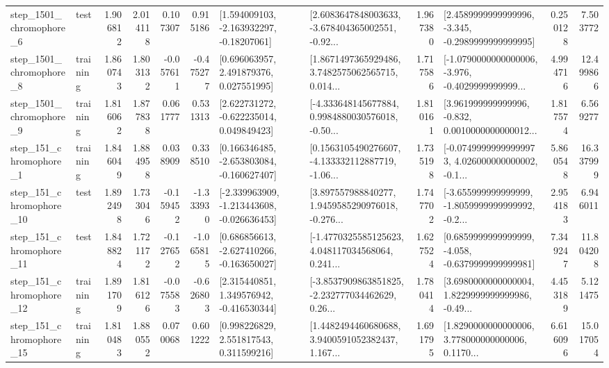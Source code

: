 \begin{tabular}{llrrrrllrlrr}
  step\_1501\_chromophore\_6 &      test &      1.906812 &    2.014118 &      0.107307 &  0.915186 &    [1.594009103, -2.163932297, -0.18207061] &  [2.6083647848003633, -3.678404365002551, -0.92... &       1.967380 &  [2.4589999999999996, -3.345, -0.2989999999999995] &            0.250128 &          7.503772 \\
  step\_1501\_chromophore\_8 &  training &      1.860743 &    1.803132 &     -0.057611 & -0.475277 &     [0.696063957, 2.491879376, 0.027551995] &  [1.8671497365929486, 3.7482575062565715, 0.014... &       1.717586 &  [-1.0790000000000006, -3.976, -0.4029999999999... &            4.994716 &         12.499866 \\
  step\_1501\_chromophore\_9 &  training &      1.816062 &    1.877838 &      0.061777 &  0.531313 &    [2.622731272, -0.622235014, 0.049849423] &  [-4.333648145677884, 0.9984880030576018, -0.50... &       1.810161 &  [3.961999999999996, -0.832, 0.0010000000000012... &            1.817574 &          6.569277 \\
   step\_151\_chromophore\_1 &  training &      1.846049 &    1.884958 &      0.038909 &  0.338510 &   [0.166346485, -2.653803084, -0.160627407] &  [0.1563105490276607, -4.133332112887719, -1.06... &       1.735198 &  [-0.07499999999999973, 4.026000000000002, -0.1... &            5.860548 &         16.337999 \\
  step\_151\_chromophore\_10 &      test &      1.892498 &    1.733046 &     -0.159452 & -1.333930 &  [-2.339963909, -1.213443608, -0.026636453] &  [3.897557988840277, 1.9459585290976018, -0.276... &       1.747702 &  [-3.655999999999999, -1.8059999999999992, -0.2... &            2.954183 &          6.946011 \\
  step\_151\_chromophore\_11 &      test &      1.848824 &    1.721172 &     -0.127652 & -1.065815 &   [0.686856613, -2.627410266, -0.163650027] &  [-1.4770325585125623, 4.048117034568064, 0.241... &       1.627524 &  [0.6859999999999999, -4.058, -0.6379999999999981] &            7.349247 &         11.804208 \\
  step\_151\_chromophore\_12 &  training &      1.891709 &    1.816126 &     -0.075583 & -0.626803 &    [2.315440851, 1.349576942, -0.416530344] &  [-3.8537909863851825, -2.232777034462629, 0.26... &       1.780414 &  [3.6980000000000004, 1.8229999999999986, -0.49... &            4.453189 &          5.121475 \\
  step\_151\_chromophore\_15 &  training &      1.810483 &    1.880552 &      0.070068 &  0.601222 &     [0.998226829, 2.551817543, 0.311599216] &  [1.4482494460680688, 3.9400591052382437, 1.167... &       1.691795 &  [1.8290000000000006, 3.778000000000006, 0.1170... &            6.616096 &         15.017054 \\

\end{tabular}

